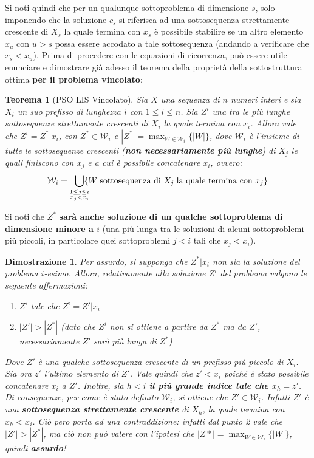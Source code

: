 \documentclass[12pt]{article}
\newtheorem{Teorema}{Teorema}[subsection]
\newtheorem{Dimostrazione}{Dimostrazione}[subsection]
\begin{document}
Si noti quindi che per un qualunque sottoproblema di dimensione $s$, solo imponendo che la soluzione $c_s$ si riferisca ad una sottosequenza strettamente crescente
di $X_s$ la quale termina con $x_s$ è possibile stabilire se un altro elemento $x_u$ con $u > s$ possa essere accodato a tale sottosequenza (andando a verificare che $x_s < x_u$). \newline
Prima di procedere con le equazioni di ricorrenza, può essere utile enunciare e dimostrare già adesso il teorema della proprietà della sottostruttura ottima \textbf{per il problema vincolato}:
\begin{Teorema}[PSO LIS Vincolato]
    Sia $X$ una sequenza di $n$ numeri interi e sia $X_i$ un suo prefisso di lunghezza $i$ con $1 \leq i \leq n$. Sia $Z^i$ una tra le più lunghe sottosequenze strettamente crescenti di $X_i$ la quale termina
    con $x_i$. Allora vale che $Z^i = Z^*|x_i$, con $Z^* \in \mathcal{W}_i$ e $|Z^*| = \max_{W \in \mathcal{W}_i}\{|W|\}$, dove $\mathcal{W}_i$ è l'insieme di tutte le sottosequenze crescenti (\textbf{non necessariamente più lunghe}) di $X_j$ le quali finiscono con $x_j$ e a cui è possibile
    concatenare $x_i$, ovvero:
    $$\mathcal{W}_i = \smashoperator[r]{\bigcup_{\substack{1 \leq j \leq i \\ x_j < x_i}}}\{W \; \textrm{sottosequenza di } X_j \; \textrm{la quale termina con } x_j\}$$
\end{Teorema}
Si noti che $Z^*$ \textbf{sarà anche soluzione di un qualche sottoproblema di dimensione minore a $i$} (una più lunga tra le soluzioni di alcuni sottoproblemi più piccoli, in particolare quei sottoproblemi $j < i$ tali che $x_j < x_i$).
\begin{Dimostrazione}
    Per assurdo, si supponga che $Z^*|x_i$ non sia la soluzione del problema $i$-esimo. Allora, relativamente alla soluzione $Z^i$ del problema valgono le seguente affermazioni:
    \begin{enumerate}
        \item $Z'$ tale che $Z^i = Z'|x_i$
        \item $|Z'| > |Z^*|$ (dato che $Z^i$ non si ottiene a partire da $Z^*$ ma da $Z'$, necessariamente $Z'$ sarà più lunga di $Z^*$)
    \end{enumerate}
    Dove $Z'$ è una qualche sottosequenza crescente di un prefisso più piccolo di $X_i$. Sia ora $z'$ l'ultimo elemento di $Z'$. Vale quindi che $z' < x_i$ poiché è stato
    possibile concatenare $x_i$ a $Z'$. Inoltre, sia $h < i$ \textbf{il più grande indice tale che $x_h = z'$}. Di conseguenze, per come è stato definito $\mathcal{W}_i$, si ottiene
    che $Z' \in \mathcal{W}_i$. Infatti $Z'$ è una \textbf{sottosequenza strettamente crescente } di $X_h$, la quale termina con $x_h < x_i$.
    Ciò pero porta ad una contraddizione: infatti dal punto 2 vale che $|Z'| > |Z^*|$, ma ciò non può valere con l'ipotesi che $|Z*| = \max_{W \in \mathcal{W}_i}\{|W|\}$, quindi \textbf{assurdo}!
\end{Dimostrazione}
\end{document}
